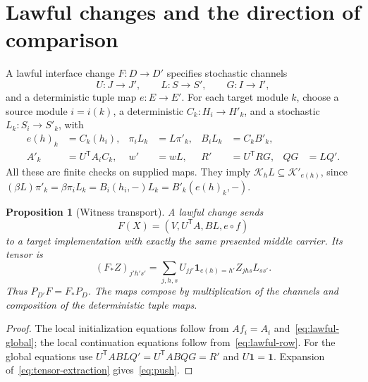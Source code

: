 \documentclass[11pt]{article}
\newcommand{\one}{\mathbf 1}
\newcommand{\Kcal}{\mathcal K}
\newtheorem{proposition}[theorem]{Proposition}
\theoremstyle{remark}
\begin{document}
\section{Lawful changes and the direction of comparison}\label{sec:transport}
A lawful interface change $F:D\to D'$ specifies stochastic channels
\[
 U:J\to J',\qquad L:S\to S',\qquad G:I\to I',
\]
and a deterministic tuple map $e:E\to E'$. For each target module $k$, choose a source module $i=i(k)$, a deterministic $C_k:H_i\to H'_k$, and a stochastic $L_k:S_i\to S'_k$, with
\begin{align}
 e(h)_k&=C_k(h_i),&
 \pi_iL_k&=L\pi'_k,& B_iL_k&=C_kB'_k,\label{eq:lawful-row}\\
 A'_k&=U^{\mathsf T}A_iC_k,&
 w'&=wL,& R'&=U^{\mathsf T}RG,& QG&=LQ'.\label{eq:lawful-global}
\end{align}
All these are finite checks on supplied maps. They imply $\Kcal_hL\subseteq\Kcal'_{e(h)}$, since
$(\beta L)\pi'_k=\beta\pi_iL_k=B_i(h_i,-)L_k=B'_k(e(h)_k,-)$.

\begin{proposition}[Witness transport]\label{prop:transport}
A lawful change sends
\[
 F(X)=(V,U^{\mathsf T}A,BL,e\circ f)
\]
to a target implementation with exactly the same presented middle carrier. Its tensor is
\begin{equation}\label{eq:push}
 (F_*Z)_{j'h's'}=\sum_{j,h,s}
 U_{jj'}\mathbf1_{e(h)=h'}Z_{jhs}L_{ss'}.
\end{equation}
Thus $P_{D'}F=F_*P_D$. The maps compose by multiplication of the channels and composition of the deterministic tuple maps.
\end{proposition}
\begin{proof}
The local initialization equations follow from $Af_i=A_i$ and~\eqref{eq:lawful-global}; the local continuation equations follow from~\eqref{eq:lawful-row}. For the global equations use
$U^{\mathsf T}ABLQ'=U^{\mathsf T}ABQG=R'$ and $U\one=\one$.
Expansion of~\eqref{eq:tensor-extraction} gives~\eqref{eq:push}.
\end{proof}
\end{document}

